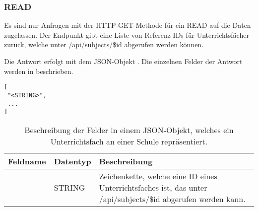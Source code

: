 \subsubsection{READ}
\label{sec:rest:api:schools:subjects:read}
Es sind nur Anfragen mit der HTTP-GET-Methode für ein READ auf die Daten zugelassen.
Der Endpunkt gibt eine Liste von Referenz-IDs für Unterrichtsfächer zurück, welche unter /api/subjects/\$id abgerufen werden können.

Die Antwort erfolgt mit dem JSON-Objekt . 
Die einzelnen Felder der Antwort werden in  beschrieben.


\begin{lstlisting}[caption={JSON-Antwort für einen GET-Aufruf des Pfads /api/schools/\$id/subjects},label={lst:code:rest:api:schools:subjects:read:ret},frame=tlrb]
[
 "<STRING>",
 ...
]
\end{lstlisting}
\begin{longtable}{|p{}|p{}|p{}|}
		\caption{Beschreibung des Feldes in einem JSON-Objekt, welches ein Unterrichtsfach an einer Schule repräsentiert.}
\endfoot
		\caption{Beschreibung der Felder in einem JSON-Objekt, welches ein Unterrichtsfach an einer Schule repräsentiert.}
		\label{tab:rest:api:schools:subjects:read:ret:json}
\endlastfoot 
\hline
			\textbf{Feldname} & \textbf{Datentyp} & \textbf{Beschreibung} \\ \hline
\endhead
 & STRING & Zeichenkette, welche eine ID eines Unterrichtsfaches ist, das unter /api/subjects/\$id abgerufen werden kann. \\ \hline
\end{longtable}
